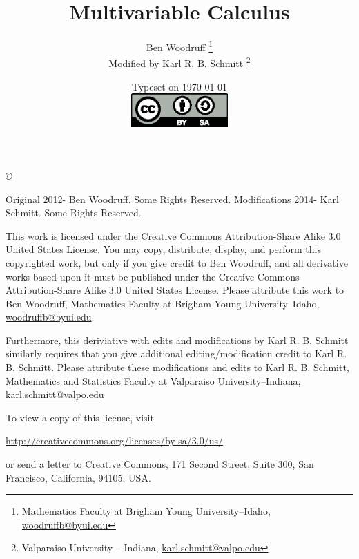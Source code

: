 \documentclass[letterpaper,oneside]{book}%
\theoremstyle{plain}
\theoremstyle{box}
\theoremstyle{problem}
\begin{document}
\frontmatter
\title{Multivariable Calculus}
\author{Ben Woodruff
				\thanks{Mathematics Faculty at Brigham Young University--Idaho, \url{woodruffb@byui.edu}}\\
				Modified by Karl R. B. Schmitt
				\thanks{Valparaiso University -- Indiana, \url{karl.schmitt@valpo.edu} }
				}
\date{Typeset on \today\\
	\vfill
	\includegraphics[height=1.3cm]{by-sa.eps}
	\vfill
	}

\maketitle

\thispagestyle{empty}

\noindent\copyright{ Original 2012- Ben Woodruff.  Some Rights Reserved. Modifications 2014- Karl Schmitt. Some Rights Reserved.\\

\bigskip

\noindent This work is licensed under the Creative Commons Attribution-Share Alike 3.0 United States License.  You may copy, distribute, display, and perform this copyrighted work, but only if you give credit to Ben Woodruff, and all derivative works based upon it must be published under the Creative Commons Attribution-Share Alike 3.0 United States License. Please attribute this work to Ben Woodruff, Mathematics Faculty at Brigham Young University--Idaho, \url{woodruffb@byui.edu}. 

\noindent Furthermore, this deriviative with edits and modifications by Karl R. B. Schmitt similarly requires that you give additional editing/modification credit to Karl R. B. Schmitt. Please attribute these modifications and edits to Karl R. B. Schmitt, Mathematics and Statistics Faculty at Valparaiso University--Indiana, \url{karl.schmitt@valpo.edu}

To view a copy of this license, visit
\begin{center}
  \url{http://creativecommons.org/licenses/by-sa/3.0/us/}
\end{center}
or send a letter to Creative Commons, 171 Second Street, Suite 300, San Francisco, California, 94105, USA.}
\end{document}
